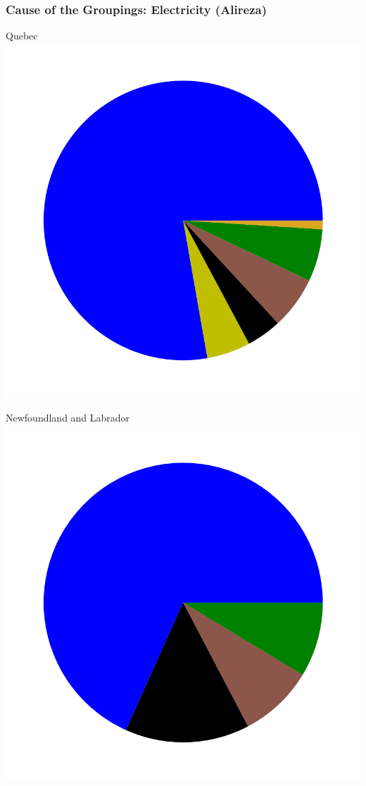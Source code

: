 \documentclass{beamer}
\begin{document}
\begin{frame}
\frametitle{Cause of the Groupings: Electricity (Alireza)}
\vspace{-25pt}
\begin{minipage}[b]{0.33\textwidth}
\begin{center}
Quebec
\includegraphics[width=\linewidth, trim={40pt 70pt 40pt 30pt}, clip]{Quebec2017.png}%
\end{center}
\end{minipage}%
%
\begin{minipage}[b]{0.33\textwidth}
\begin{center}
Newfoundland and Labrador
\includegraphics[width=\linewidth, trim={40pt 70pt 40pt 30pt}, clip]{NL2017.png}%

\end{center}
\end{minipage}
\end{frame}
\end{document}
